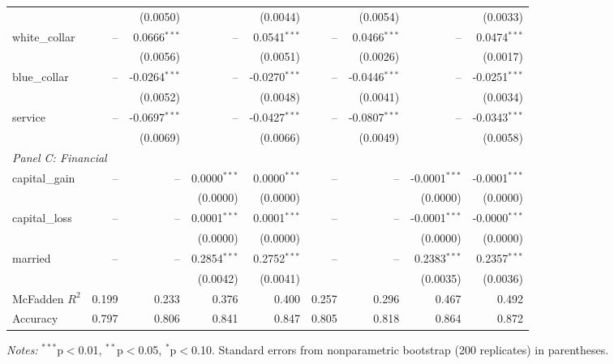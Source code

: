 \documentclass[12pt]{article}
\begin{document}
\begin{table}[htbp]
{\begin{threeparttable}
\begin{tabular}{lrrrrrrrr}
				&  & (0.0050) &  & (0.0044) &  & (0.0054) &  & (0.0033) \\
				\quad white\_collar & -- & 0.0666$^{***}$ & -- & 0.0541$^{***}$ & -- & 0.0466$^{***}$ & -- & 0.0474$^{***}$ \\
				&  & (0.0056) &  & (0.0051) &  & (0.0026) &  & (0.0017) \\
				\quad blue\_collar & -- & -0.0264$^{***}$ & -- & -0.0270$^{***}$ & -- & -0.0446$^{***}$ & -- & -0.0251$^{***}$ \\
				&  & (0.0052) &  & (0.0048) &  & (0.0041) &  & (0.0034) \\
				\quad service & -- & -0.0697$^{***}$ & -- & -0.0427$^{***}$ & -- & -0.0807$^{***}$ & -- & -0.0343$^{***}$ \\
				&  & (0.0069) &  & (0.0066) &  & (0.0049) &  & (0.0058) \\
				\midrule
				\multicolumn{9}{l}{\textit{Panel C: Financial}} \\
				\quad capital\_gain & -- & -- & 0.0000$^{***}$ & 0.0000$^{***}$ & -- & -- & -0.0001$^{***}$ & -0.0001$^{***}$ \\
				&  &  & (0.0000) & (0.0000) &  &  & (0.0000) & (0.0000) \\
				\quad capital\_loss & -- & -- & 0.0001$^{***}$ & 0.0001$^{***}$ & -- & -- & -0.0001$^{***}$ & -0.0000$^{***}$ \\
				&  &  & (0.0000) & (0.0000) &  &  & (0.0000) & (0.0000) \\
				\quad married & -- & -- & 0.2854$^{***}$ & 0.2752$^{***}$ & -- & -- & 0.2383$^{***}$ & 0.2357$^{***}$ \\
				&  &  & (0.0042) & (0.0041) &  &  & (0.0035) & (0.0036) \\
				\midrule
				McFadden $R^2$ & 0.199 & 0.233 & 0.376 & 0.400 & 0.257 & 0.296 & 0.467 & 0.492 \\
				Accuracy & 0.797 & 0.806 & 0.841 & 0.847 & 0.805 & 0.818 & 0.864 & 0.872 \\
				\bottomrule
			\end{tabular}
			\begin{tablenotes}
				\footnotesize
				\item \textit{Notes:} $^{***}$p$<$0.01, $^{**}$p$<$0.05, $^{*}$p$<$0.10. Standard errors from nonparametric bootstrap (200 replicates) in parentheses.
			\end{tablenotes}
		\end{threeparttable}
		}%
	\end{table}
	
\end{document}

